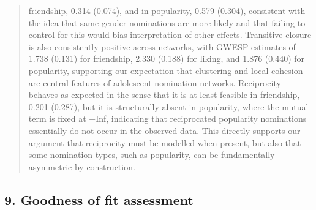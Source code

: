 \documentclass[
  letterpaper,
  DIV=11,
  numbers=noendperiod]{scrartcl}
\begin{document}
\begin{quote}
friendship, 0.314 (0.074), and in popularity, 0.579 (0.304), consistent
with the idea that same gender nominations are more likely and that
failing to control for this would bias interpretation of other effects.
Transitive closure is also consistently positive across networks, with
GWESP estimates of 1.738 (0.131) for friendship, 2.330 (0.188) for
liking, and 1.876 (0.440) for popularity, supporting our expectation
that clustering and local cohesion are central features of adolescent
nomination networks. Reciprocity behaves as expected in the sense that
it is at least feasible in friendship, 0.201 (0.287), but it is
structurally absent in popularity, where the mutual term is fixed at
−Inf, indicating that reciprocated popularity nominations essentially do
not occur in the observed data. This directly supports our argument that
reciprocity must be modelled when present, but also that some nomination
types, such as popularity, can be fundamentally asymmetric by
construction.
\end{quote}

\subsection{9. Goodness of fit
assessment}\label{goodness-of-fit-assessment}
\end{document}
